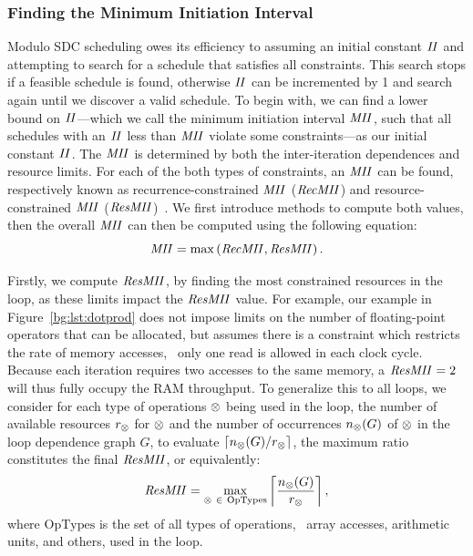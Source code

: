 \subsubsection{Finding the Minimum Initiation Interval}

Modulo SDC scheduling owes its efficiency to assuming an initial constant
$\mathit{II}$ and attempting to search for a schedule that satisfies all constraints.
This search stops if a feasible schedule is found, otherwise $\mathit{II}$ can be
incremented by 1 and search again until we discover a valid schedule.  To
begin with, we can find a lower bound on $\mathit{II}$---which we call the minimum
initiation interval $\mathit{MII}$, such that all schedules with an $\mathit{II}$ less than
$\mathit{MII}$ violate some constraints---as our initial constant $\mathit{II}$.  The $\mathit{MII}$ is
determined by both the inter-iteration dependences and resource limits.  For
each of the both types of constraints, an $\mathit{MII}$ can be found, respectively
known as recurrence-constrained $\mathit{MII}$ ($\mathit{RecMII}$) and resource-constrained
$\mathit{MII}$ ($\mathit{ResMII}$)~\cite{rau94, canis14, zhang13}.  We first introduce methods
to compute both values, then the overall $\mathit{MII}$ can then be computed using the
following equation:
\begin{equation}
    \mathit{MII} = \max\left(\mathit{RecMII}, \mathit{ResMII}\right).
\end{equation}

Firstly, we compute $\mathit{ResMII}$, by finding the most constrained resources
in the loop, as these limits impact the $\mathit{ResMII}$ value.  For example, our
example in Figure~\ref{bg:lst:dotprod} does not impose limits on the number
of floating-point operators that can be allocated, but assumes there is a
constraint which restricts the rate of memory accesses, \ie~only one read is
allowed in each clock cycle.  Because each iteration requires two accesses to
the same memory, a $\mathit{ResMII} = 2$ will thus fully occupy the RAM throughput.
To generalize this to all loops, we consider for each type of operations
$\otimes$ being used in the loop, the number of available resources
$r_\otimes$ for $\otimes$ and the number of occurrences $n_\otimes(G)$
of $\otimes$ in the loop dependence graph $G$, to evaluate $\left\lceil
n_\otimes(G) / r_\otimes \right\rceil$, the maximum ratio constitutes the
final $\mathit{ResMII}$, or equivalently:
\begin{equation}
    \mathit{ResMII} = \max_{\otimes~\in~\mathrm{OpTypes}}
        \left\lceil
            \frac{n_\otimes(G)}{r_\otimes}
        \right\rceil,
\end{equation}
where $\mathrm{OpTypes}$ is the set of all types of operations, \eg~array
accesses, arithmetic units, and others, used in the loop.

